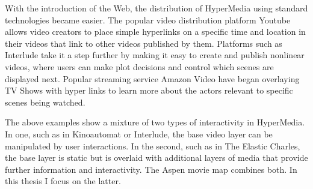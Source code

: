 With the introduction of the Web, the distribution of HyperMedia using standard technologies became easier. The popular video distribution platform Youtube\cite{youtube} allows video creators to place simple hyperlinks on a specific time and location in their videos that link to other videos published by them. Platforms such as Interlude\cite{interlude} take it a step further by making it easy to create and publish nonlinear videos, where users can make plot decisions and control which scenes are displayed next. Popular streaming service Amazon Video \cite{amazonvideo} have began overlaying TV Shows with hyper links to learn more about the actors relevant to specific scenes being watched.

The above examples show a mixture of two types of interactivity in HyperMedia. In one, such as in Kinoautomat or Interlude, the base video layer can be manipulated by user interactions. In the second, such as in The Elastic Charles, the base layer is static but is overlaid with additional layers of media that provide further information and interactivity. The Aspen movie map combines both. In this thesis I focus on the latter.  



